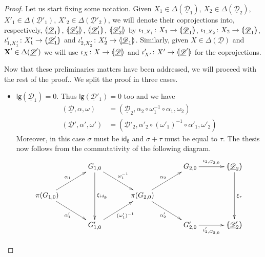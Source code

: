 \documentclass[a4paper,UKenglish,cleveref,pdftex, thm-restate,numberwithinsect,anonymous]{lipics}
\newcommand{\id}[1]{\mathsf{id}_{#1}}
\def\X{\textbf {\textup{X}}}
\newcommand{\dder}[1]{\mathscr{#1}}
\newcommand{\der}[1]{\underline{\dder{#1}}}
\newcommand{\lpro}{\langle \hspace{-1.85pt}[}
\newcommand{\rpro}{]\hspace{-1.85pt}\rangle}
\newcommand{\tpro}[1]{\lpro \der{#1}\rpro}
\newcommand{\lgh}[0]{\mathsf{lg}}
\begin{document}
\begin{proof}
  Let us start fixing some notation. Given $X_1\in \Delta(\der{D}_1)$,
  $X_2\in \Delta(\der{D}_2)$, $X'_1\in \Delta(\der{D}'_1)$,
  $X'_2\in \Delta(\der{D}'_2)$, we will denote their coprojections
  into, respectively, $\lpro \der{D}_1\rpro$, $\lpro \der{D}'_2\rpro$,
  $\lpro \der{D}'_1\rpro$, $\lpro \der{D}'_2\rpro$ by
  $\iota_{1, X_1}\colon X_1\to \lpro\der{D}_1\rpro$,
  $\iota_{1, X_2}\colon X_2\to \lpro\der{D}_1\rpro$,
  $\iota'_{1, X'_1}\colon X'_1\to \lpro\der{D}'_1\rpro$ and
  $\iota'_{2, X'_2}\colon X'_2\to \lpro\der{D}_1\rpro$. Similarly,
  given $X\in \Delta(\der{D})$ and $\X'\in \Delta(\der{D}')$ we will
  use $\iota_X\colon X\to \tpro{D}$ and
  $\iota'_{X'}\colon X'\to \lpro \der{D}' \rpro$ for the
  coprojections.

  Now that these preliminaries matters have been addressed, we will proceed with the rest of the proof.. We split the proof in three cases.
  \begin{itemize}
  \item $\lgh(\der{D}_1)=0$. Thus $\lgh(\der{D}'_1)=0$ too  and we have
    \begin{align*}
      (\der{D}, \alpha, \omega) & =(\der{D}_2, \alpha_2\circ \omega_1^{-1}\circ \alpha_1, \omega_2) \\ (\der{D}', \alpha', \omega')&=(\der{D}'_2, \alpha'_2\circ (\omega'_1)^{-1}\circ \alpha'_1, \omega'_2)
    \end{align*}
    Moreover, in this case $\sigma$ must be $\id{\emptyset}$ and $\sigma+\tau$ must be equal to $\tau$. The thesis now follows from the commutativity of the following diagram.
    \[\xymatrix@C=35pt{& G_{1,0}\ar[dd]^{\xi_{\id{\emptyset}}} \ar[dr]^{\omega^{-1}_1}&&G_{2,0}\ar[r]^-{\iota_{2, G_{2,0}}} & \lpro \der{D}_2\rpro \ar[dd]^{\xi_{\tau}}\\\pi(G_{1,0})  \ar[ur]^{\alpha_1} \ar[dr]_{\alpha'_1}&& \pi(G_{2,0}) \ar[ur]^{\alpha_2} \ar[dr]_{\alpha'_2}\\& G'_{1,0} \ar[ur]_{(\omega'_1)^{-1}}&&G'_{2,0} \ar[r]_-{\iota'_{2, G_{2,0}}}& \lpro \der{D}'_2\rpro}\]


\end{itemize}
\end{proof}
\end{document}
